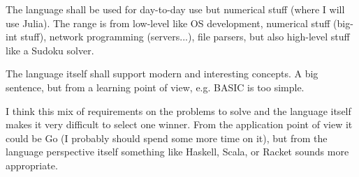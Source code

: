 The language shall be used for day-to-day use but numerical stuff (where I will use Julia). The range is from low-level like OS development, numerical stuff (big-int stuff), network programming (servers...), file parsers, but also high-level stuff like a Sudoku solver.

The language itself shall support modern and interesting concepts. A big sentence, but from a learning point of view, e.g. BASIC is too simple.

I think this mix of requirements on the problems to solve and the language itself makes it very difficult to select one winner. From the application point of view it could be Go (I probably should spend some more time on it), but from the language perspective itself something like Haskell, Scala, or Racket sounds more appropriate.
